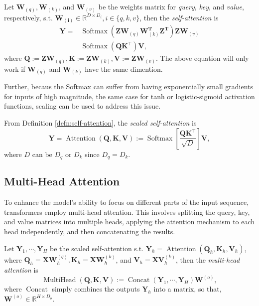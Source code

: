 \begin{defn}\label{defn:self-attention}
    Let $\mathbf{W}_{(q)},\mathbf{W}_{(k)}$, and $\mathbf{W}_{(v)}$ be the weights matrix for \textit{query}, \textit{key}, and \textit{value}, respectively, s.t. $\mathbf{W_{(i)}}\in\mathbb{R}^{D\times D_i},i\in\{q,k,v\}$, then the \textit{self-attention} is 
    \begin{align}
        \mathbf{Y}=&\operatorname{Softmax}(\mathbf{Z}\mathbf{W}_{(q)}\mathbf{W}_{(k)}^{\mathbf{T}}\mathbf{Z}^{\mathbf{T}})\mathbf{Z}\mathbf{W}_{(v)}\\
        &\operatorname{Softmax}(\mathbf{Q}\mathbf{K}^{\top})\mathbf{V},
    \end{align}
    where $\mathbf{Q}:=\mathbf{Z}\mathbf{W}_{(q)},\mathbf{K}:=\mathbf{Z}\mathbf{W}_{(k)},\mathbf{V}:=\mathbf{Z}\mathbf{W}_{(v)}$. The above equation will only work if $\mathbf{W}_{(q)}$ and $\mathbf{W}_{(k)}$ have the same dimention.
\end{defn}

Further, becaus the Softmax can suffer from having exponentially small gradients for inputs of high magnitude, the same case for tanh or logistic-sigmoid activation functions, scaling can be used to address this issue.

\begin{defn}
    From Definition \ref{defn:self-attention}, the \textit{scaled self-attention} is
    \begin{equation}
        \mathbf{Y}=\operatorname{Attention}(\mathbf{Q},\mathbf{K},\mathbf{V}):=\operatorname{Softmax}\left[\frac{\mathbf{Q}\mathbf{K}^{\top}}{\sqrt{D}}\right]\mathbf{V},
    \end{equation}
    where $D$ can be $D_q$ or $D_k$ since $D_q=D_k$.
\end{defn}

\subsection{Multi-Head Attention}
To enhance the model's ability to focus on different parts of the input sequence, transformers employ multi-head attention. This involves splitting the query, key, and value matrices into multiple heads, applying the attention mechanism to each head independently, and then concatenating the results.
\begin{defn}
    Let $\mathbf{Y}_1,\cdots,\mathbf{Y}_H$ be the scaled self-attention s.t. $\mathbf{Y}_h=\operatorname{Attention}(\mathbf{Q}_h,\mathbf{K}_h,\mathbf{V}_h)$, where $\mathbf{Q}_h=\mathbf{X}\mathbf{W}_h^{(q)},\mathbf{K}_h=\mathbf{X}\mathbf{W}_h^{(k)}$, and $\mathbf{V}_h=\mathbf{X}\mathbf{V}_h^{(k)}$, then the \textit{multi-head attention} is
    \begin{equation}
        \operatorname{MultiHead}(\mathbf{Q},\mathbf{K},\mathbf{V}):=\operatorname{Concat}(\mathbf{Y}_1,\cdots,\mathbf{Y}_H)\mathbf{W}^{(o)},
    \end{equation}
    where $\operatorname{Concat}$ simply combines the outputs $\mathbf{Y}_h$ into a matrix, so that, $\mathbf{W}^{(o)}\in\mathbb{R}^{H\times D_o}$.
\end{defn}
